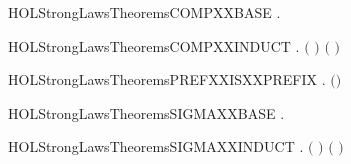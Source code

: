 \newcommand{\HOLStrongLawsTheoremsCCSXXSIGMAXXcompute}{\UseVerbatim{HOLStrongLawsTheoremsCCSXXSIGMAXXcompute}}
\begin{SaveVerbatim}{HOLStrongLawsTheoremsCOMPXXBASE}
\HOLTokenTurnstile{} \HOLSymConst{\HOLTokenForall{}}.    \HOLSymConst{\ensuremath{=}}  
\end{SaveVerbatim}
\newcommand{\HOLStrongLawsTheoremsCOMPXXBASE}{\UseVerbatim{HOLStrongLawsTheoremsCOMPXXBASE}}
\begin{SaveVerbatim}{HOLStrongLawsTheoremsCOMPXXINDUCT}
\HOLTokenTurnstile{} \HOLSymConst{\HOLTokenForall{}} .   \ensuremath{(} \ensuremath{)} \HOLSymConst{\ensuremath{=}}    \HOLSymConst{\ensuremath{\mid}}  \ensuremath{(} \ensuremath{)}
\end{SaveVerbatim}
\newcommand{\HOLStrongLawsTheoremsCOMPXXINDUCT}{\UseVerbatim{HOLStrongLawsTheoremsCOMPXXINDUCT}}
\begin{SaveVerbatim}{HOLStrongLawsTheoremsPREFXXISXXPREFIX}
\HOLTokenTurnstile{} \HOLSymConst{\HOLTokenForall{}} .  \ensuremath{(}\HOLSymConst{\ensuremath{\ldotp}}\ensuremath{)}
\end{SaveVerbatim}
\newcommand{\HOLStrongLawsTheoremsPREFXXISXXPREFIX}{\UseVerbatim{HOLStrongLawsTheoremsPREFXXISXXPREFIX}}
\begin{SaveVerbatim}{HOLStrongLawsTheoremsSIGMAXXBASE}
\HOLTokenTurnstile{} \HOLSymConst{\HOLTokenForall{}}. \HOLConst{\HOLTokenSum{}}   \HOLSymConst{\ensuremath{=}}  
\end{SaveVerbatim}
\newcommand{\HOLStrongLawsTheoremsSIGMAXXBASE}{\UseVerbatim{HOLStrongLawsTheoremsSIGMAXXBASE}}
\begin{SaveVerbatim}{HOLStrongLawsTheoremsSIGMAXXINDUCT}
\HOLTokenTurnstile{} \HOLSymConst{\HOLTokenForall{}} . \HOLConst{\HOLTokenSum{}}  \ensuremath{(} \ensuremath{)} \HOLSymConst{\ensuremath{=}} \HOLConst{\HOLTokenSum{}}   \HOLSymConst{\ensuremath{+}}  \ensuremath{(} \ensuremath{)}
\end{SaveVerbatim}
\newcommand{\HOLStrongLawsTheoremsSIGMAXXINDUCT}{\UseVerbatim{HOLStrongLawsTheoremsSIGMAXXINDUCT}}

